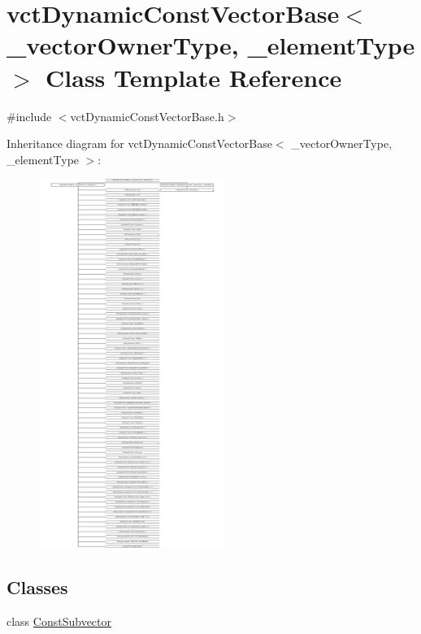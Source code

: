 \hypertarget{classvct_dynamic_const_vector_base}{\section{vct\-Dynamic\-Const\-Vector\-Base$<$ \-\_\-vector\-Owner\-Type, \-\_\-element\-Type $>$ Class Template Reference}
\label{classvct_dynamic_const_vector_base}
}


{\ttfamily \#include $<$vct\-Dynamic\-Const\-Vector\-Base.\-h$>$}

Inheritance diagram for vct\-Dynamic\-Const\-Vector\-Base$<$ \-\_\-vector\-Owner\-Type, \-\_\-element\-Type $>$\-:\begin{figure}[H]
\begin{center}
\leavevmode
\includegraphics[height=12.000000cm]{df/d70/classvct_dynamic_const_vector_base}
\end{center}
\end{figure}
\subsection*{Classes}
\begin{DoxyCompactItemize}
\item 
class \hyperlink{classvct_dynamic_const_vector_base_1_1_const_subvector}{Const\-Subvector}
\end{DoxyCompactItemize}
